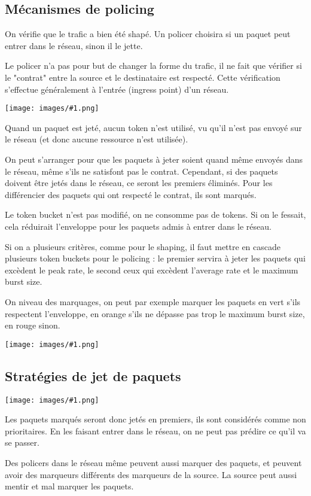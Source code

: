 \documentclass[10pt,a4paper]{report}
\newcommand{\dessin}[1]{\begin{center}\texttt{[image: images/\#1.png]}\end{center}}
\begin{document}
		\subsection{Mécanismes de policing}
		
		On vérifie que le trafic a bien été shapé. Un policer choisira si un paquet peut entrer dans le réseau, sinon il le jette.
		
		Le policer n'a pas pour but de changer la forme du trafic, il ne fait que vérifier si le "contrat" entre la source et le destinataire est respecté. Cette vérification s'effectue généralement à l'entrée (ingress point) d'un réseau.
		
		\dessin{107}
		
		Quand un paquet est jeté, aucun token n'est utilisé, vu qu'il n'est pas envoyé sur le réseau (et donc aucune ressource n'est utilisée).
				
		On peut s'arranger pour que les paquets à jeter soient quand même envoyés dans le réseau, même s'ils ne satisfont pas le contrat. Cependant, si des paquets doivent être jetés dans le réseau, ce seront les premiers éliminés. Pour les différencier des paquets qui ont respecté le contrat, ils sont marqués.
		
		Le token bucket n'est pas modifié, on ne consomme pas de tokens. Si on le fessait, cela réduirait l'enveloppe pour les paquets admis à entrer dans le réseau.
		
		Si on a plusieurs critères, comme pour le shaping, il faut mettre en cascade plusieurs token buckets pour le policing : le premier servira à jeter les paquets qui excèdent le peak rate, le second ceux qui excèdent l'average rate et le maximum burst size.
		
		On niveau des marquages, on peut par exemple marquer les paquets en vert s'ils respectent l'enveloppe, en orange s'ils ne dépasse pas trop le maximum burst size, en rouge sinon.
		
		\dessin{108}
		
				
		\subsection{Stratégies de jet de paquets}
		
		\dessin{109}
		
		Les paquets marqués seront donc jetés en premiers, ils sont considérés comme non prioritaires. En les faisant entrer dans le réseau, on ne peut pas prédire ce qu'il va se passer.
		
		Des policers dans le réseau même peuvent aussi marquer des paquets, et peuvent avoir des marqueurs différents des marqueurs de la source. La source peut aussi mentir et mal marquer les paquets.
		
\end{document}
